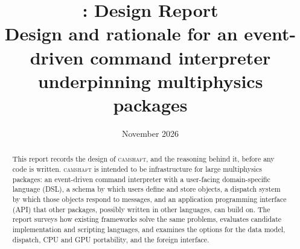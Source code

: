 \documentclass[11pt,a4paper]{article}
\title{\camshaft{}: Design Report\\[0.4ex]
\large Design and rationale for an event-driven command interpreter\\
underpinning multiphysics packages}
\author{}
\date{November 2026}
\newcommand{\camshaft}{\textsc{camshaft}}
\begin{document}
\maketitle

\begin{abstract}
\noindent
This report records the design of \camshaft{}, and the reasoning behind it,
before any code is written.
\camshaft{} is intended to be infrastructure for large multiphysics packages: an
event-driven command interpreter with a user-facing domain-specific language
(DSL), a schema by which users define and store objects, a dispatch system by
which those objects respond to messages, and an application programming
interface (API) that other packages, possibly written in other languages, can
build on.  The report surveys how existing frameworks solve the same problems,
evaluates candidate implementation and scripting languages, and examines the
options for the data model, dispatch, CPU and GPU portability, and the foreign
interface.


\end{abstract}
\end{document}
